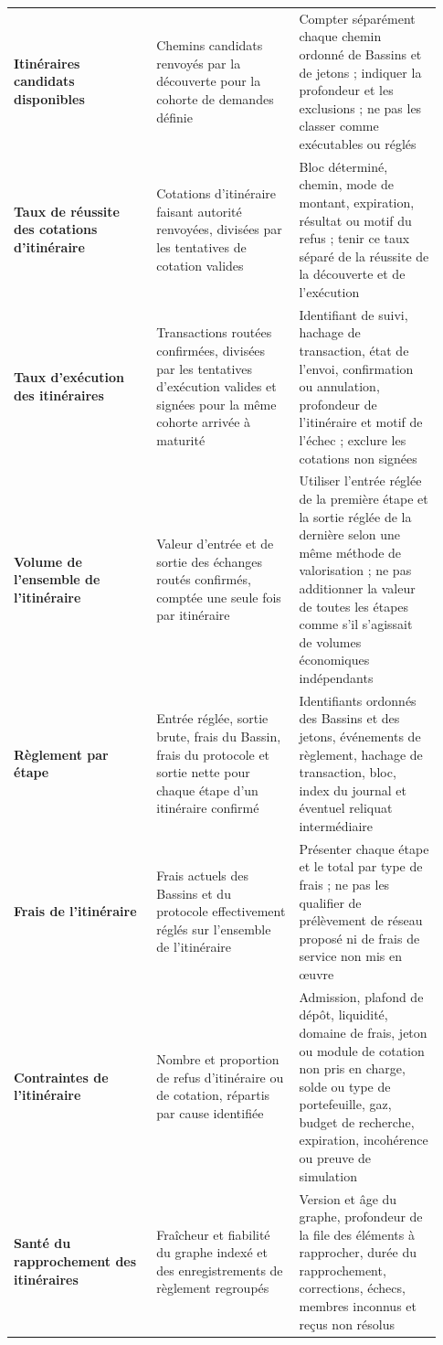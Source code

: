 \documentclass[11pt]{article}
\begin{document}
\begin{longtable}{P{0.31\linewidth} P{0.31\linewidth} P{0.31\linewidth}}
\textbf{Itinéraires candidats disponibles} & Chemins candidats renvoyés par la découverte pour la cohorte de demandes définie & Compter séparément chaque chemin ordonné de Bassins et de jetons ; indiquer la profondeur et les exclusions ; ne pas les classer comme exécutables ou réglés \\
\textbf{Taux de réussite des cotations d'itinéraire} & Cotations d'itinéraire faisant autorité renvoyées, divisées par les tentatives de cotation valides & Bloc déterminé, chemin, mode de montant, expiration, résultat ou motif du refus ; tenir ce taux séparé de la réussite de la découverte et de l'exécution \\
\textbf{Taux d'exécution des itinéraires} & Transactions routées confirmées, divisées par les tentatives d'exécution valides et signées pour la même cohorte arrivée à maturité & Identifiant de suivi, hachage de transaction, état de l'envoi, confirmation ou annulation, profondeur de l'itinéraire et motif de l'échec ; exclure les cotations non signées \\
\textbf{Volume de l'ensemble de l'itinéraire} & Valeur d'entrée et de sortie des échanges routés confirmés, comptée une seule fois par itinéraire & Utiliser l'entrée réglée de la première étape et la sortie réglée de la dernière selon une même méthode de valorisation ; ne pas additionner la valeur de toutes les étapes comme s'il s'agissait de volumes économiques indépendants \\
\textbf{Règlement par étape} & Entrée réglée, sortie brute, frais du Bassin, frais du protocole et sortie nette pour chaque étape d'un itinéraire confirmé & Identifiants ordonnés des Bassins et des jetons, événements de règlement, hachage de transaction, bloc, index du journal et éventuel reliquat intermédiaire \\
\textbf{Frais de l'itinéraire} & Frais actuels des Bassins et du protocole effectivement réglés sur l'ensemble de l'itinéraire & Présenter chaque étape et le total par type de frais ; ne pas les qualifier de prélèvement de réseau proposé ni de frais de service non mis en œuvre \\
\textbf{Contraintes de l'itinéraire} & Nombre et proportion de refus d'itinéraire ou de cotation, répartis par cause identifiée & Admission, plafond de dépôt, liquidité, domaine de frais, jeton ou module de cotation non pris en charge, solde ou type de portefeuille, gaz, budget de recherche, expiration, incohérence ou preuve de simulation \\
\textbf{Santé du rapprochement des itinéraires} & Fraîcheur et fiabilité du graphe indexé et des enregistrements de règlement regroupés & Version et âge du graphe, profondeur de la file des éléments à rapprocher, durée du rapprochement, corrections, échecs, membres inconnus et reçus non résolus \\

\end{longtable}
\end{document}
